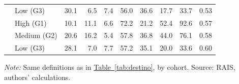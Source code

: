 {\begin{threeparttable}
\begin{tabular}{llrrrrrrrr}
 & Low (G3) & 30.1 & 6.5 & 7.4 & 56.0 & 36.6 & 17.7 & 33.7 & 0.53 \\
\addlinespace[3pt]
2021 & High (G1) & 10.1 & 11.1 & 6.6 & 72.2 & 21.2 & 52.4 & 92.6 & 0.57 \\
 & Medium (G2) & 20.6 & 16.2 & 5.4 & 57.8 & 36.8 & 44.0 & 76.1 & 0.58 \\
 & Low (G3) & 28.1 & 7.0 & 7.7 & 57.2 & 35.1 & 20.0 & 33.6 & 0.60 \\
\bottomrule
\end{tabular}
\begin{tablenotes}[flushleft]\footnotesize
\item \textit{Note:} Same definitions as in \hyperref[tab:destino]{Table~\ref*{tab:destino}}, by cohort. Source: RAIS, authors' calculations.
\end{tablenotes}
\end{threeparttable}
}
